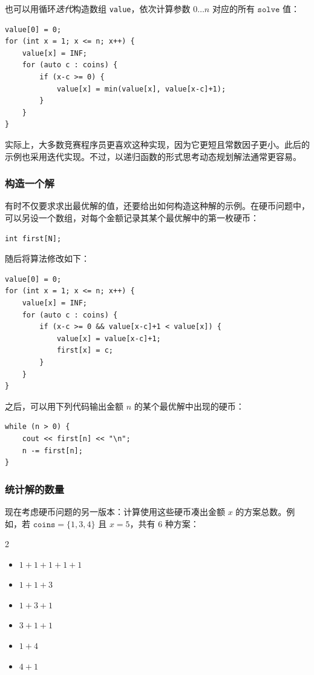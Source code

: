 也可以用循环\emph{迭代}构造数组 \texttt{value}，依次计算参数 $0\ldots n$ 对应的所有 $\texttt{solve}$ 值：
\begin{lstlisting}
value[0] = 0;
for (int x = 1; x <= n; x++) {
    value[x] = INF;
    for (auto c : coins) {
        if (x-c >= 0) {
            value[x] = min(value[x], value[x-c]+1);
        }
    }
}
\end{lstlisting}

实际上，大多数竞赛程序员更喜欢这种实现，因为它更短且常数因子更小。此后的示例也采用迭代实现。不过，以递归函数的形式思考动态规划解法通常更容易。


\subsubsection{构造一个解}

有时不仅要求求出最优解的值，还要给出如何构造这种解的示例。在硬币问题中，可以另设一个数组，对每个金额记录其某个最优解中的第一枚硬币：
\begin{lstlisting}
int first[N];
\end{lstlisting}
随后将算法修改如下：
\begin{lstlisting}
value[0] = 0;
for (int x = 1; x <= n; x++) {
    value[x] = INF;
    for (auto c : coins) {
        if (x-c >= 0 && value[x-c]+1 < value[x]) {
            value[x] = value[x-c]+1;
            first[x] = c;
        }
    }
}
\end{lstlisting}
之后，可以用下列代码输出金额 $n$ 的某个最优解中出现的硬币：
\begin{lstlisting}
while (n > 0) {
    cout << first[n] << "\n";
    n -= first[n];
}
\end{lstlisting}

\subsubsection{统计解的数量}

现在考虑硬币问题的另一版本：计算使用这些硬币凑出金额 $x$ 的方案总数。例如，若 $\texttt{coins}=\{1,3,4\}$ 且 $x=5$，共有 6 种方案：

\begin{multicols}{2}
\begin{itemize}
\item $1+1+1+1+1$
\item $1+1+3$
\item $1+3+1$
\item $3+1+1$
\item $1+4$
\item $4+1$
\end{itemize}
\end{multicols}

